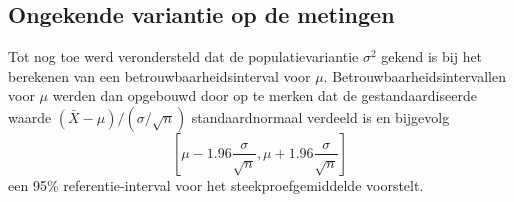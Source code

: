 \documentclass[
  12pt,dutch,coursenotes]{book}
\theoremstyle{definition}
\theoremstyle{definition}
\theoremstyle{definition}
\theoremstyle{remark}
\begin{document}
\hypertarget{sec:tBI}{%
\subsection{Ongekende variantie op de metingen}\label{sec:tBI}}

Tot nog toe werd verondersteld dat de populatievariantie \(\sigma^2\) gekend is bij het berekenen van een betrouwbaarheidsinterval voor \(\mu\).
Betrouwbaarheidsintervallen voor \(\mu\) werden dan opgebouwd door op te
merken dat de gestandaardiseerde waarde \((\bar{X} - \mu)/(\sigma/\sqrt{n})\)
standaardnormaal verdeeld is en bijgevolg
\begin{equation*}
\left[\mu - 1.96 \frac{\sigma}{\sqrt{n}},\mu + 1.96 \frac{\sigma}{\sqrt{n}}%
\right]
\end{equation*}
een 95\% referentie-interval voor het steekproefgemiddelde voorstelt.
\end{document}
